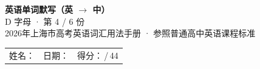 \documentclass[10pt,a4paper]{article}
\begin{document}
\pagestyle{plain}

\begin{center}
{\LARGE\bfseries 英语单词默写（英 $\to$ 中）}\\[0.22em]
{\large D 字母 · 第 4 / 6 份}\\[0.18em]
{\small 2026年上海市高考英语词汇用法手册 · 参照普通高中英语课程标准}
\end{center}

\vspace{0.25em}
\noindent\begin{tabular}{@{}p{}@{}p{}@{}p{}@{}}
姓名：\underline{\hspace{2.0cm}} & 日期：\underline{\hspace{2.0cm}} & 得分：\underline{\hspace{1.3cm}}\,/\,44 \\
\end{tabular}

\vspace{0.3em}

\vspace{0.08em}
\end{document}
